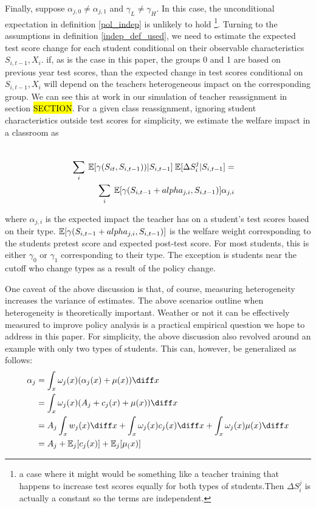 \documentclass{article}
\theoremstyle{definition}
\theoremstyle{definition}
\theoremstyle{definition}
\theoremstyle{definition}
\begin{document}
    Finally, suppose $\alpha_{j,0} \neq \alpha_{j,1}$ and $\gamma_L \neq \gamma_H$. In this case, the unconditional expectation in definition \ref{pol_indep} is unlikely to hold \footnote{a case where it might would be something like a teacher training that happens to increase test scores equally for both types of students.Then $\Delta S_i^j$ is actually a constant so the terms are independent.}. Turning to the assumptions in definition \ref{indep_def_used}, we need to estimate the expected test score change for each student conditional on their observable characteristics $S_{i,t-1}, X_i$. if, as is the case in this paper, the groups 0 and 1 are based on previous year test scores, than the expected change in test scores conditional on $S_{i,t-1}, X_i$ will depend on the teachers heterogeneous impact on the corresponding group. We can see this at work in our simulation of teacher reassignment in section \hl{SECTION}. For a given class reassignment, ignoring student characteristics outside test scores for simplicity, we estimate the welfare impact in a classroom as 
    
    \begin{align}
      \\ \sum_i \: \mathbb{E}[\gamma(S_{it}, S_{i,t-1}))|S_{i,t-1}] \:\mathbb{E}[\Delta S_i^j|S_{i,t-1}]  = &
      \\ \sum_i \: \mathbb{E}[\gamma(S_{i,t-1} + alpha_{j,i}, S_{i,t-1})] \alpha_{j,i}
    \end{align}

    where $\alpha_{j,i}$ is the expected impact the teacher has on a student's test scores based on their type. $\mathbb{E}[\gamma(S_{i,t-1} + alpha_{j,i}, S_{i,t-1})]$ is the welfare weight corresponding to the students pretest score and expected post-test score. For most students, this is either $\gamma_0$ or $\gamma_1$ corresponding to their type. The exception is students near the cutoff who change types as a result of the policy change. 
    
    One caveat of the above discussion is that, of course, measuring heterogeneity increases the variance of estimates. The above scenarios outline when heterogeneity is theoretically important. Weather or not it can be effectively measured to improve policy analysis is a practical empirical question we hope to address in this paper. For simplicity, the above discussion also revolved around an example with only two types of students. This can, however, be generalized as follows: 
    \begin{align*}
        \alpha_j  &= \int_x \omega_j(x)(\alpha_j(x) + \mu(x)) \diff x \\
                  &= \int_x \omega_j(x)(A_j + c_j(x) + \mu(x)) \diff x \\
                  &= A_j \int_x w_j(x) \diff x + \int_x \omega_j(x) c_j(x)\diff x + \int_x \omega_j(x) \mu(x)\diff x \\
                  &= A_j  + \mathbb{E}_j[c_j(x)] + \mathbb{E}_j[\mu_(x)]
    \end{align*}
    
\end{document}
